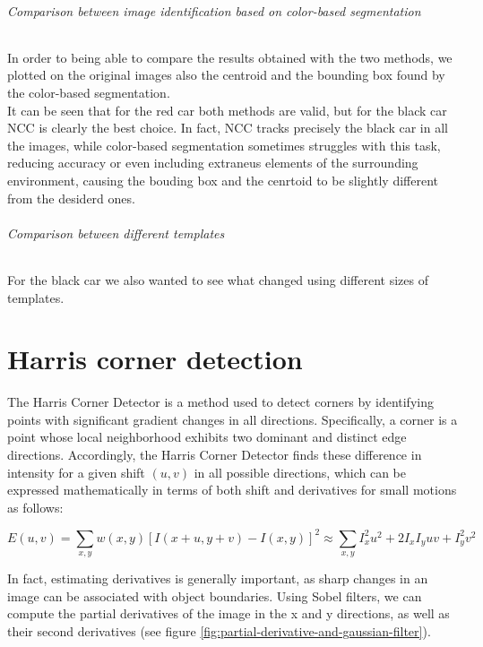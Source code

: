 \subparagraph{Comparison between image identification based on color-based segmentation}
In order to being able to compare the results obtained with the two methods, we plotted on the original images also the centroid and the bounding box found by the 
color-based segmentation.\\ It can be seen that for the red car both methods are valid, but for the black car NCC is clearly the best choice. In fact, NCC tracks precisely the
black car in all the images, while color-based segmentation sometimes struggles with this task, reducing accuracy or even including extraneus elements of the surrounding 
environment, causing the bouding box and the cenrtoid to be slightly different from the desiderd ones.

\subparagraph{Comparison between different templates}
For the black car we also wanted to see what changed using different sizes of templates.





\chapter{Harris corner detection}
The Harris Corner Detector is a method used to detect corners by identifying points with significant gradient changes in all directions. Specifically, a corner is a point whose local neighborhood exhibits two dominant and distinct edge directions. Accordingly, the Harris Corner Detector finds these difference in intensity for a given shift $(u, v)$ in all possible directions, which can be expressed mathematically in terms of both shift and derivatives for small motions as follows:

\begin{equation}
	E(u, v) = \sum_{x, y} w(x, y) [I(x+u, y+v)-I(x, y)]^2 \approx \sum_{x, y} I_x^2 u^2 + 2I_x I_y uv + I_y^2 v^2
\end{equation}

In fact, estimating derivatives is generally important, as sharp changes in an image can be associated with object boundaries. Using Sobel filters, we can compute the partial derivatives of the image in the x and y directions, as well as their second derivatives (see figure \ref{fig:partial-derivative-and-gaussian-filter}).

